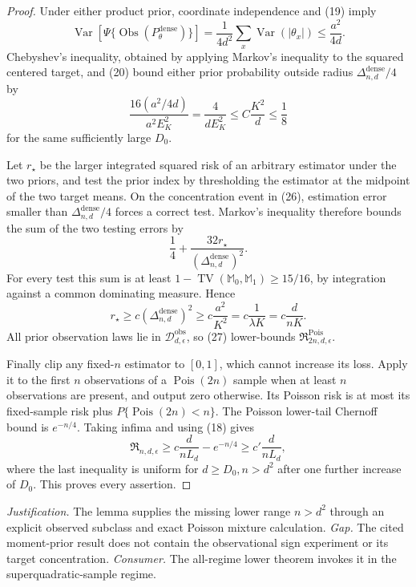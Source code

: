 \documentclass{article}
\begin{document}
\begin{proof}
Under either product prior, coordinate independence and (19) imply
\[
 \operatorname{Var}[\Psi\{\operatorname{Obs}(P_\theta^{\mathrm{dense}})\}]
 =\frac1{4d^2}\sum_x\operatorname{Var}(|\theta_x|)
 \leq\frac{a^2}{4d}.                                                 \tag{25}
\]
Chebyshev's inequality, obtained by applying Markov's inequality to the squared centered target, and (20) bound either prior probability outside radius \(\Delta_{n,d}^{\mathrm{dense}}/4\) by
\[
 \frac{16(a^2/4d)}{a^2E_K^2}=\frac4{dE_K^2}\leq C\frac{K^2}{d}\leq\frac18 \tag{26}
\]
for the same sufficiently large \(D_0\).

Let \(r_\star\) be the larger integrated squared risk of an arbitrary estimator under the two priors, and test the prior index by thresholding the estimator at the midpoint of the two target means.  On the concentration event in (26), estimation error smaller than \(\Delta_{n,d}^{\mathrm{dense}}/4\) forces a correct test.  Markov's inequality therefore bounds the sum of the two testing errors by
\[
 \frac14+\frac{32r_\star}{(\Delta_{n,d}^{\mathrm{dense}})^2}.
\]
For every test this sum is at least \(1-\operatorname{TV}(\mathbb M_0,\mathbb M_1)\geq15/16\), by integration against a common dominating measure.  Hence
\[
 r_\star\geq c(\Delta_{n,d}^{\mathrm{dense}})^2
 \geq c\frac{a^2}{K^2}=c\frac1{\lambda K}=c\frac d{nK}.           \tag{27}
\]
All prior observation laws lie in \(\mathcal D_{d,\epsilon}^{\mathrm{obs}}\), so (27) lower-bounds \(\mathfrak R^{\mathrm{Pois}}_{2n,d,\epsilon}\).

Finally clip any fixed-\(n\) estimator to \([0,1]\), which cannot increase its loss.  Apply it to the first \(n\) observations of a \(\operatorname{Pois}(2n)\) sample when at least \(n\) observations are present, and output zero otherwise.  Its Poisson risk is at most its fixed-sample risk plus \(P\{\operatorname{Pois}(2n)<n\}\).  The Poisson lower-tail Chernoff bound is \(e^{-n/4}\).  Taking infima and using (18) gives
\[
 \mathfrak R_{n,d,\epsilon}\geq c\frac d{nL_d}-e^{-n/4}
 \geq c'\frac d{nL_d},                                               \tag{28}
\]
where the last inequality is uniform for \(d\geq D_0,n>d^2\) after one further increase of \(D_0\).  This proves every assertion.
\end{proof}
\par\smallskip\noindent \textit{Justification.} The lemma supplies the missing lower range \(n>d^2\) through an explicit observed subclass and exact Poisson mixture calculation. \textit{Gap.} The cited moment-prior result does not contain the observational sign experiment or its target concentration. \textit{Consumer.} The all-regime lower theorem invokes it in the superquadratic-sample regime.
\end{document}
